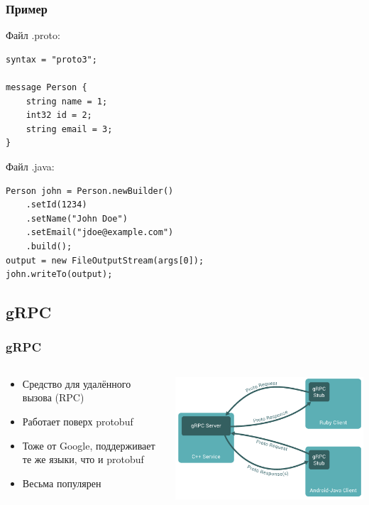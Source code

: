 \documentclass{../../slides-style}
\begin{document}
    \begin{frame}[fragile]
        \frametitle{Пример}
        Файл .proto:
        \begin{verbatim}
syntax = "proto3";

message Person {
    string name = 1;
    int32 id = 2;
    string email = 3;
}
        \end{verbatim}
        \vspace{2mm}
        Файл .java:
        \begin{verbatim}
Person john = Person.newBuilder()
    .setId(1234)
    .setName("John Doe")
    .setEmail("jdoe@example.com")
    .build();
output = new FileOutputStream(args[0]);
john.writeTo(output);
        \end{verbatim}
    \end{frame}

    \subsection{gRPC}

    \begin{frame}
        \frametitle{gRPC}
        \begin{columns}
            \begin{column}{0.6\textwidth}
                \begin{itemize}
                    \item Средство для удалённого вызова (RPC)
                    \item Работает поверх protobuf
                    \item Тоже от Google, поддерживает те же языки, что и protobuf
                    \item Весьма популярен
                \end{itemize}
            \end{column}
            \begin{column}{0.4\textwidth}
                \begin{center}
                    \includegraphics[width=\textwidth]{grpc.png}
                \end{center}
            \end{column}
        \end{columns}
    \end{frame}
\end{document}
